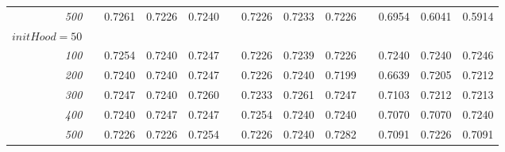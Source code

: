 \documentclass[a4paper, 10pt]{article}
\begin{document}
\begin{figure}[h]
\begin{tabular}{@{}rcrrrcrrrcrrr@{}}
        \emph{500}  &&  0.7261  &  0.7226  &  0.7240  &&  0.7226  &  0.7233  &  0.7226  &&  0.6954  &  0.6041  &  0.5914 \\
        $initHood = 50$ \\
        \emph{100}  &&  0.7254  &  0.7240  &  0.7247  &&  0.7226  &  0.7239  &  0.7226  &&  0.7240  &  0.7240  &  0.7246 \\
        \emph{200}  &&  0.7240  &  0.7240  &  0.7247  &&  0.7226  &  0.7240  &  0.7199  &&  0.6639  &  0.7205  &  0.7212 \\
        \emph{300}  &&  0.7247  &  0.7240  &  0.7260  &&  0.7233  &  0.7261  &  0.7247  &&  0.7103  &  0.7212  &  0.7213 \\
        \emph{400}  &&  0.7240  &  0.7247  &  0.7247  &&  0.7254  &  0.7240  &  0.7240  &&  0.7070  &  0.7070  &  0.7240 \\
        \emph{500}  &&  0.7226  &  0.7226  &  0.7254  &&  0.7226  &  0.7240  &  0.7282  &&  0.7091  &  0.7226  &  0.7091 \\
%
%
%
%
         \bottomrule
      \end{tabular} 
      \caption{}
      \label{fig:bayes}
    \end{figure}




    
    
    
    
    
    
    
    
    
\end{document}
